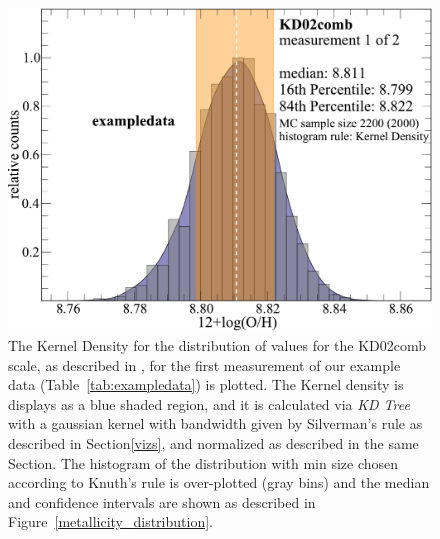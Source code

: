 \documentclass{emulateapj}
\begin{document}
\begin{figure}[ht!]
  \includegraphics[width=1.0\columnwidth]{exampledata_n2000_KD02comb_1KDE.pdf}
   \caption{The Kernel Density for the distribution of values for the KD02comb scale, as described in \citet{kewley08}, for the first measurement of our example data (Table~\ref{tab:exampledata}) is plotted. The Kernel density is displays as a blue shaded region, and it is calculated via \emph{KD Tree} with a gaussian kernel with bandwidth given by Silverman's rule as described in Section\ref{vizs}, and normalized as described in the same Section. The histogram of the distribution with min size chosen according to Knuth's rule is over-plotted (gray bins) and the median and confidence intervals are shown as described in Figure~\ref{metallicity_distribution}.}\label{fig:KDE}

\end{figure}
\end{document}
